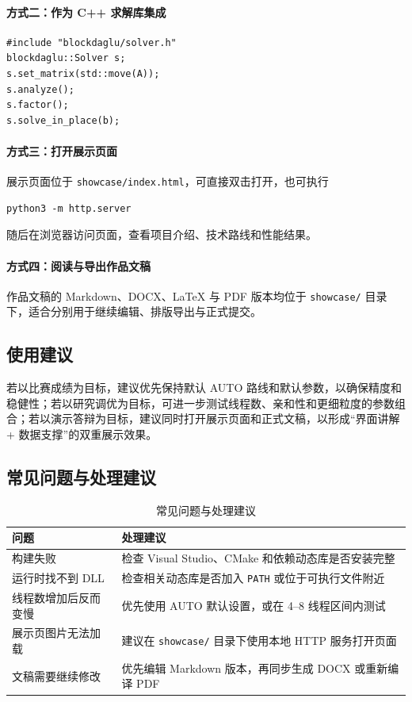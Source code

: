 \documentclass[12pt,a4paper,fontset=none]{ctexart}
\begin{document}
\paragraph{方式二：作为 C++ 求解库集成}
\begin{verbatim}
#include "blockdaglu/solver.h"
blockdaglu::Solver s;
s.set_matrix(std::move(A));
s.analyze();
s.factor();
s.solve_in_place(b);
\end{verbatim}

\paragraph{方式三：打开展示页面}
展示页面位于 \texttt{showcase/index.html}，可直接双击打开，也可执行
\begin{verbatim}
python3 -m http.server
\end{verbatim}
随后在浏览器访问页面，查看项目介绍、技术路线和性能结果。

\paragraph{方式四：阅读与导出作品文稿}
作品文稿的 Markdown、DOCX、LaTeX 与 PDF 版本均位于 \texttt{showcase/} 目录下，适合分别用于继续编辑、排版导出与正式提交。

\subsection{使用建议}

若以比赛成绩为目标，建议优先保持默认 AUTO 路线和默认参数，以确保精度和稳健性；若以研究调优为目标，可进一步测试线程数、亲和性和更细粒度的参数组合；若以演示答辩为目标，建议同时打开展示页面和正式文稿，以形成“界面讲解 + 数据支撑”的双重展示效果。

\subsection{常见问题与处理建议}

\begin{table}[H]
\centering
\caption{常见问题与处理建议}
\label{tab:faq}
\begin{tabular}{p{4cm}p{8cm}}
\toprule
问题 & 处理建议 \\
\midrule
构建失败 & 检查 Visual Studio、CMake 和依赖动态库是否安装完整 \\
运行时找不到 DLL & 检查相关动态库是否加入 \texttt{PATH} 或位于可执行文件附近 \\
线程数增加后反而变慢 & 优先使用 AUTO 默认设置，或在 4--8 线程区间内测试 \\
展示页图片无法加载 & 建议在 \texttt{showcase/} 目录下使用本地 HTTP 服务打开页面 \\
文稿需要继续修改 & 优先编辑 Markdown 版本，再同步生成 DOCX 或重新编译 PDF \\
\bottomrule
\end{tabular}
\end{table}
\end{document}
